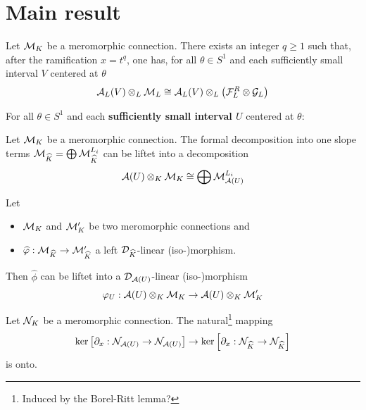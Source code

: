 \section{Main result}
\begin{thm}[2.3.1]
  Let $\mathcal{M}_K$ be a meromorphic connection. There exists an integer $q\geq 1$
  such that, after the ramification $x=t^q$, one has, for all $\theta\in S^1$
  and each sufficiently small interval $V$ centered at $\theta$
  \[
    \mathcal{A}_L(V)\otimes_L\mathcal{M}_L \cong
      \mathcal{A}_L(V)\otimes_L\left(\mathcal{F}_L^R\otimes\mathcal{G}_L\right)
  \]
\end{thm}
For all $\theta\in S^1$ and each \textbf{sufficiently small interval $U$}
centered
at $\theta$:
\begin{cor}[2.3.2]
  Let $\mathcal{M}_K$ be a meromorphic connection.
  The formal decomposition into one slope terms
  $\mathcal{M}_{\widehat K}=\bigoplus \mathcal{M}_{\widehat K}^{L_i}$ can be liftet into a
  decomposition
  \[
    \mathcal{A}(U)\otimes_K\mathcal{M}_K \cong \bigoplus\mathcal{M}_{\mathcal{A}(U)}^{L_i}
  \]
\end{cor}
\begin{cor}[2.3.3]
  Let
  \begin{itemize}
    \item $\mathcal{M}_K$ and $\mathcal{M}_K'$ be two meromorphic connections and
    \item $\widehat{\varphi}:\mathcal{M}_{\widehat{K}}\to\mathcal{M}_{\widehat{K}}'$ a left
      $\mathcal{D}_{\widehat K}$-linear \textcolor{green!40!black}{(iso-)}morphism.
  \end{itemize}
  Then
  $\hat\phi$ can be liftet into a $\mathcal{D}_{\mathcal{A}(U)}$-linear
  \textcolor{green!40!black}{(iso-)}morphism
  \[
    \varphi_U:\mathcal{A}(U)\otimes_K\mathcal{M}_K\to\mathcal{A}(U)\otimes_K\mathcal{M}_K'
  \]

  \begin{lem}[2.3.4]
    Let $\mathcal{N}_K$ be a meromorphic connection.
    The natural\footnote{Induced by the Borel-Ritt lemma?} mapping
    \[
      \ker\left[\partial_x:\mathcal{N}_{\mathcal{A}(U)}\to\mathcal{N}_{\mathcal{A}(U)}\right]
      \to
      \ker\left[\partial_x:\mathcal{N}_{\widehat K}\to\mathcal{N}_{\widehat K}\right]
    \]
    is onto.
  \end{lem}
\end{cor}

